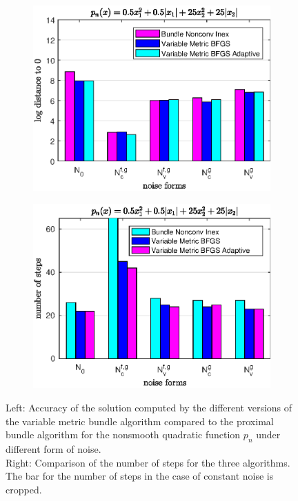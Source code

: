 \begin{figure}[H]
	\begin{subfigure}[t]{0.49\textwidth}
		\includegraphics[width=\textwidth]{Pictures/Plots/accuracy_bar_nonsm_parab.eps}
	\end{subfigure}
	\begin{subfigure}[t]{0.49\textwidth}
			\includegraphics[width=\textwidth]{Pictures/Plots/steps_bar_nonsm_parab.eps}
	\end{subfigure}
	\caption{Left: Accuracy of the solution computed by the different versions of the variable metric bundle algorithm compared to the proximal bundle algorithm for the nonsmooth quadratic function \(p_n\) under different form of noise.\\
	Right: Comparison of the number of steps for the three algorithms. The bar for the number of steps in the case of constant noise is cropped.}
	\label{fig_bar_nonsm_parab}
\end{figure}

